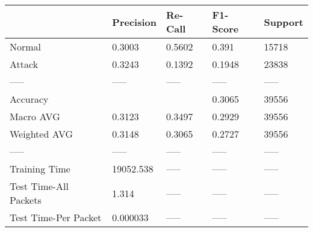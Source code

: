 \begin{tabular}{lllll}
\toprule
{} &  Precision & Re-Call & F1-Score & Support \\
\midrule
Normal                &     0.3003 &  0.5602 &    0.391 &   15718 \\
Attack                &     0.3243 &  0.1392 &   0.1948 &   23838 \\
-----                 &      ----- &   ----- &    ----- &   ----- \\
Accuracy              &            &         &   0.3065 &   39556 \\
Macro AVG             &     0.3123 &  0.3497 &   0.2929 &   39556 \\
Weighted AVG          &     0.3148 &  0.3065 &   0.2727 &   39556 \\
-----                 &      ----- &   ----- &    ----- &   ----- \\
Training Time         &  19052.538 &   ----- &    ----- &   ----- \\
Test Time-All Packets &      1.314 &   ----- &    ----- &   ----- \\
Test Time-Per Packet  &   0.000033 &   ----- &    ----- &   ----- \\
\bottomrule
\end{tabular}
